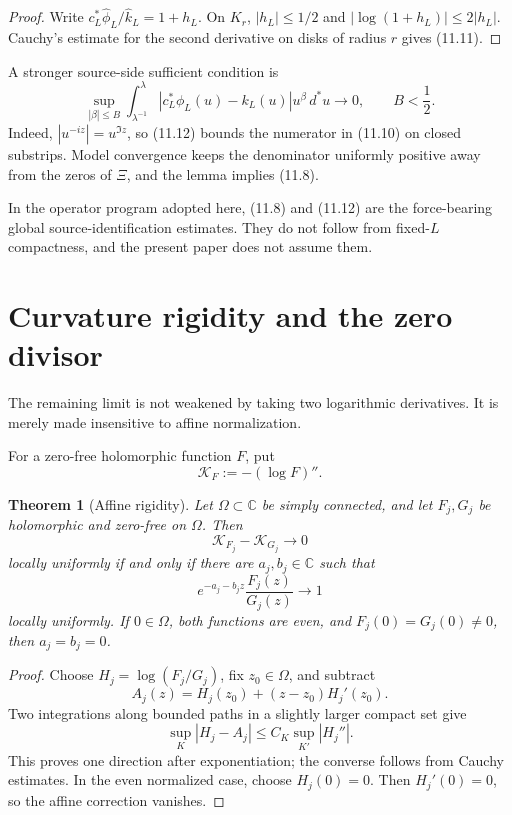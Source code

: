\documentclass[11pt]{amsart}
\newtheorem{theorem}{Theorem}[section]
\theoremstyle{definition}
\theoremstyle{remark}
\newcommand{\C}{\mathbb C}
\newcommand{\XiR}{\Xi}
\begin{document}
\begin{proof}
Write \(c_L^*\widehat\phi_L/\widehat k_L=1+h_L\).  On \(K_r\),
\(|h_L|\le1/2\) and \(|\log(1+h_L)|\le2|h_L|\).  Cauchy's estimate for
the second derivative on disks of radius \(r\) gives (11.11).
\end{proof}

A stronger source-side sufficient condition is
\[
 \sup_{|\beta|\le B}
 \int_{\lambda^{-1}}^\lambda
 |c_L^*\phi_L(u)-k_L(u)|u^\beta\,d^*u
 \longrightarrow0,
 \qquad B<\frac12.
\tag{11.12}
\]
Indeed, \(|u^{-iz}|=u^{\Im z}\), so (11.12) bounds the numerator in
(11.10) on closed substrips.  Model convergence keeps the denominator
uniformly positive away from the zeros of \(\XiR\), and the lemma implies
(11.8).

In the operator program adopted here, (11.8) and (11.12) are the
force-bearing global source-identification estimates.  They do not follow
from fixed-\(L\) compactness, and the present paper does not assume them.

\section{Curvature rigidity and the zero divisor}
\label{sec:rigidity}

The remaining limit is not weakened by taking two logarithmic derivatives.
It is merely made insensitive to affine normalization.

For a zero-free holomorphic function \(F\), put
\[
 \mathcal K_F:=-(\log F)''.
\]

\begin{theorem}[Affine rigidity]
\label{thm:affine-rigidity}
Let \(\Omega\subset\C\) be simply connected, and let \(F_j,G_j\) be
holomorphic and zero-free on \(\Omega\).  Then
\[
 \mathcal K_{F_j}-\mathcal K_{G_j}\longrightarrow0
\]
locally uniformly if and only if there are \(a_j,b_j\in\C\) such that
\[
 e^{-a_j-b_jz}\frac{F_j(z)}{G_j(z)}\longrightarrow1
\]
locally uniformly.  If \(0\in\Omega\), both functions are even, and
\(F_j(0)=G_j(0)\ne0\), then \(a_j=b_j=0\).
\end{theorem}

\begin{proof}
Choose \(H_j=\log(F_j/G_j)\), fix \(z_0\in\Omega\), and subtract
\[
 A_j(z)=H_j(z_0)+(z-z_0)H_j'(z_0).
\]
Two integrations along bounded paths in a slightly larger compact set give
\[
 \sup_K|H_j-A_j|\le C_K\sup_{K'}|H_j''|.
\]
This proves one direction after exponentiation; the converse follows from
Cauchy estimates.  In the even normalized case, choose \(H_j(0)=0\).
Then \(H_j'(0)=0\), so the affine correction vanishes.
\end{proof}
\end{document}
